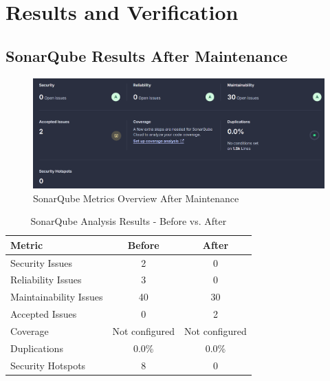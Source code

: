 \documentclass[12pt,a4paper]{article}
\begin{document}
\section{Results and Verification}
\subsection{SonarQube Results After Maintenance}

\begin{figure}[H]
    \centering
    \includegraphics[width=1\textwidth]{SonarQube Metrics Overview-A.jpg.png}
    \caption{SonarQube Metrics Overview After Maintenance}
    \label{fig:SMO-A}
\end{figure}

\begin{table}[H]
\centering
\begin{tabular}{lcc}
\toprule
\textbf{Metric} & \textbf{Before} & \textbf{After} \\ 
\midrule
Security Issues & 2 & 0 \\ 
Reliability Issues & 3 & 0 \\ 
Maintainability Issues & 40 & 30 \\ 
Accepted Issues & 0 & 2 \\ 
Coverage & Not configured & Not configured \\ 
Duplications & 0.0\% & 0.0\% \\ 
Security Hotspots & 8 & 0 \\ 
\bottomrule
\end{tabular}
\caption{SonarQube Analysis Results - Before vs. After}
\end{table}
\end{document}
